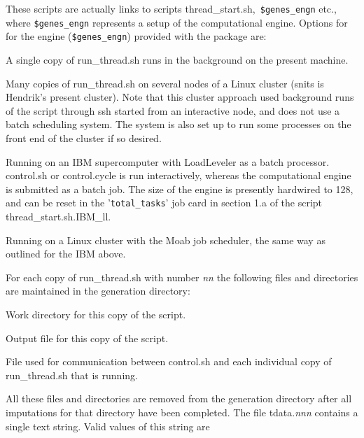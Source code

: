 \documentclass[12pt]{article}
\newcommand{\file}{\sf}
\newcommand{\code}{\tt}
\newenvironment{flist}{\begin{list}{nofile ?}{\parsep 0mm
            \itemsep 0mm \leftmargin 35mm \labelwidth 25mm
            \rightmargin 10mm}}{\end{list}}
\newcommand{\fit}[2]{\item[{\file{#1}}\hfill]{#2}}
\newenvironment{plist}{\begin{list}{nofile ?}{\parsep 0mm
            \itemsep 0mm \leftmargin 35mm \labelwidth 25mm
            \rightmargin 10mm}}{\end{list}}
\newcommand{\pit}[2]{\item[{\code{#1}}\hfill]{#2}}
\begin{document}
\noindent
These scripts are actually links to scripts {\file thread\_start.sh,}{\code
\$genes\_engn} etc., where {\code \$genes\_engn} represents a setup of the
computational engine. Options for for the engine ({\code \$genes\_engn})
provided with the package are:

\begin{plist}
\pit{single}{A single copy of {\file run\_thread.sh} runs in the background on
             the present machine.}

\pit{snits} {Many copies of {\file run\_thread.sh} on several nodes of a Linux
             cluster (snits is Hendrik's present cluster). Note that this
             cluster approach used background runs of the script through
             {\file ssh} started from an interactive node, and does not use a
             batch scheduling system. The system is also set up to run some
             processes on the front end of the cluster if so desired.}

\pit{IBM\_ll}{Running on an IBM supercomputer with LoadLeveler as a batch
             processor. {\file control.sh} or {\file control.cycle} is run
             interactively, whereas the computational engine is submitted as a
             batch job. The size of the engine is presently hardwired to 128,
             and can be reset in the '{\code total\_tasks}' job card in
             section 1.a of the script {\file thread\_start.sh.IBM\_ll}.}

\pit{Moab}  {Running on a Linux cluster with the Moab job scheduler, the same
             way as outlined for the IBM above.} 

\end{plist}

\noindent
For each copy of {\file run\_thread.sh} with number {\it nn} the following
files and directories are maintained in the generation directory:

\begin{flist}
\fit{thread\_{\it nnn}}{Work directory for this copy of the script.}
\fit{thread\_{\it nnn}.out}{Output file for this copy of the script.}
\fit{tdata.{\it nnn}.out}{File used for communication between {\file
                         control.sh} and each individual copy of {\file
                         run\_thread.sh} that is running.}
\end{flist}

\noindent
All these files and directories are removed from the generation directory
after all imputations for that directory have been completed.  The file {\file
tdata.{\it nnn}} contains a single text string. Valid values of this string
are
\end{document}
